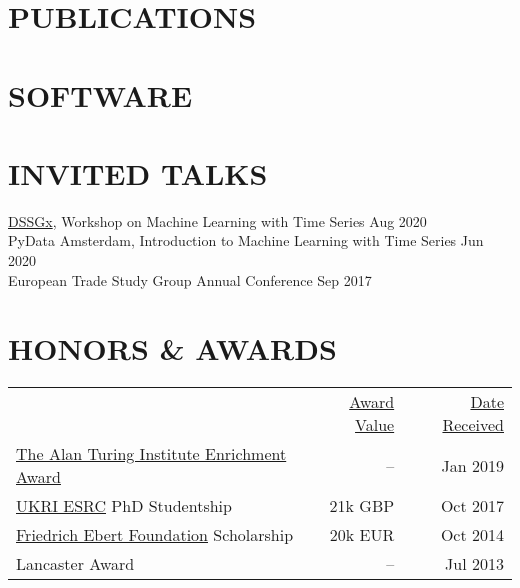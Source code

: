 \documentclass{cv}
\newcommand{\printbibsection}[2]{
\begin{refsection}
\nocite{*}
\printbibliography[sorting=chronological,
                  type={#1},
                  title={#2},
                  heading=none]
\end{refsection}
}
\begin{document}
\section{PUBLICATIONS}
\printbibsection{article}{}

\section{SOFTWARE}
\printbibsection{misc}{}

\section{INVITED TALKS}

\href{https://www.datascienceforsocialgood.org}{DSSGx}, Workshop on Machine Learning with Time Series \hfill Aug 2020 \\

PyData Amsterdam, Introduction to Machine Learning with Time Series \hfill Jun 2020 \\

European Trade Study Group Annual Conference \hfill Sep 2017 \\


\section{HONORS \& AWARDS}

\noindent
\begin{tabularx}{\textwidth}{@{}lrr}
& \underline{Award Value} & \underline{Date Received} \\
\href{https://www.turing.ac.uk/work-turing/studentships/enrichment}{The Alan Turing Institute Enrichment Award} & -- & Jan 2019 \\
\href{https://esrc.ukri.org}{UKRI ESRC} PhD Studentship & 21k GBP & Oct 2017 \\
\href{https://www.fes.de}{Friedrich Ebert Foundation} Scholarship & 20k EUR & Oct 2014 \\
Lancaster Award & -- & Jul 2013 \\
\end{tabularx}


\end{document}

